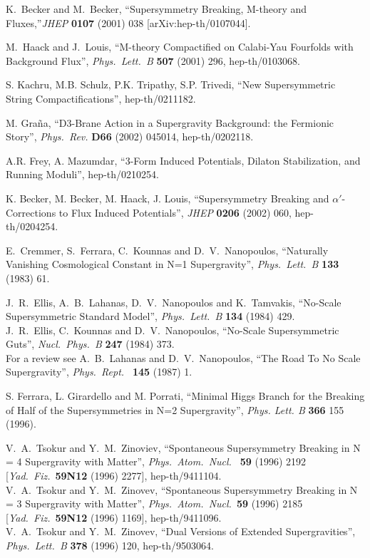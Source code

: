 \documentclass[a4paper,12pt]{article}
\begin{document}
\begin{thebibliography}{99}
 K.~Becker and M.~Becker,
``Supersymmetry Breaking, M-theory and Fluxes,''{\it  JHEP} {\bf 0107} (2001) 038
[arXiv:hep-th/0107044].

 M.~Haack and J.~Louis,
``M-theory Compactified on Calabi-Yau Fourfolds with Background Flux'',
{\it Phys.\ Lett.\ B} {\bf 507} (2001) 296, hep-th/0103068. 


S. Kachru, M.B. Schulz, P.K. Tripathy, S.P. Trivedi, 
``New Supersymmetric String Compactifications'', hep-th/0211182.

M. Gra\~na, ``D3-Brane Action in a Supergravity Background: the Fermionic Story'', {\it Phys.\ Rev.} {\bf D66} (2002) 045014, 
hep-th/0202118.



A.R. Frey, A. Mazumdar, 
``3-Form Induced Potentials, Dilaton Stabilization, and Running Moduli'', 
hep-th/0210254.

K. Becker, M. Becker, M. Haack, J. Louis, ``Supersymmetry Breaking and $\alpha'$-Corrections to Flux Induced Potentials'',
{\it  JHEP} {\bf 0206} (2002) 060, hep-th/0204254.

 E.~Cremmer, S.~Ferrara, C.~Kounnas and D.~V.~Nanopoulos,
``Naturally Vanishing Cosmological Constant in N=1 Supergravity'', {\it Phys.\ Lett.\ B} {\bf 133} (1983) 61.


 J.~R.~Ellis, A.~B.~Lahanas, D.~V.~Nanopoulos and K.~Tamvakis,
``No-Scale Supersymmetric Standard Model'', {\it Phys.\ Lett.\ B} {\bf 134} (1984) 429. \\
J.~R.~Ellis, C.~Kounnas and D.~V.~Nanopoulos, ``No-Scale
Supersymmetric Guts'', {\it  Nucl.\ Phys.\ B} {\bf 247} (1984) 373.\\
For a review  see A.~B.~Lahanas and D.~V.~Nanopoulos, ``The Road
To No Scale Supergravity'',
{\it Phys.\ Rept.\ } {\bf 145} (1987) 1.



S. Ferrara, L. Girardello and M. Porrati, ``Minimal Higgs Branch
for the Breaking of Half of the Supersymmetries in N=2
Supergravity'', {\it Phys. Lett. B} {\bf 366}  155 (1996).





 V.~A.~Tsokur and Y.~M.~Zinoviev,
``Spontaneous Supersymmetry Breaking in N = 4 Supergravity with Matter'',
{\it Phys.\ Atom.\ Nucl.\ } {\bf 59} (1996) 2192 [{\it Yad.\ Fiz.}\ {\bf 59N12} (1996) 2277], hep-th/9411104.\\
V.~A.~Tsokur and Y.~M.~Zinovev, ``Spontaneous Supersymmetry
Breaking in N = 3 Supergravity with Matter'', {\it Phys.\ Atom.\
Nucl.}\  {\bf 59} (1996) 2185 [{\it Yad.\ Fiz.}\  {\bf 59N12} (1996)
1169], hep-th/9411096.\\
V.~A.~Tsokur and Y.~M.~Zinovev,
``Dual Versions of Extended Supergravities'', {\it Phys.\ Lett.\ B} {\bf 378} (1996) 120, hep-th/9503064.


\end{thebibliography}
\end{document}
